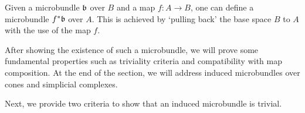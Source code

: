 \begin{myparagraph}
    Given a microbundle $\bb$ over $B$ and a map $f: A \to B$,
    one can define a microbundle $\ind{f}\bb$ over $A$.
    This is achieved by `pulling back' the base space $B$ to $A$
    with the use of the map $f$.

    After showing the existence of such a microbundle,
    we will prove some fundamental properties
    such as triviality criteria and compatibility with map composition.
    At the end of the section,
    we will address induced microbundles over cones and simplicial complexes.
\end{myparagraph}


\begin{myparagraph}
    Next, we provide two criteria
    to show that an induced microbundle is trivial.
\end{myparagraph}




